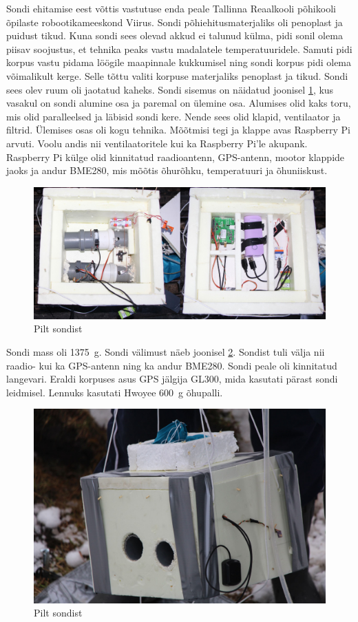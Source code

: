 \documentclass{trkut}%
\begin{document}
Sondi ehitamise eest võttis vastutuse enda peale Tallinna Reaalkooli põhikooli õpilaste robootikameeskond Viirus. Sondi põhiehitusmaterjaliks oli penoplast ja puidust tikud. Kuna sondi sees olevad akkud ei talunud külma, pidi sonil olema piisav soojustus, et tehnika peaks vastu madalatele temperatuuridele. Samuti pidi korpus vastu pidama löögile maapinnale kukkumisel ning sondi korpus pidi olema võimalikult kerge. Selle tõttu valiti korpuse materjaliks penoplast ja tikud. Sondi sees olev ruum oli jaotatud kaheks. Sondi sisemus on näidatud joonisel \ref{sond1}, kus vasakul on sondi alumine osa ja paremal on ülemine osa. Alumises olid kaks toru, mis olid paralleelsed ja läbisid sondi kere. Nende sees olid klapid, ventilaator ja filtrid. Ülemises osas oli kogu tehnika. Mõõtmisi tegi ja klappe avas Raspberry Pi arvuti. Voolu andis nii ventilaatoritele kui ka Raspberry Pi'le akupank. Raspberry Pi külge olid kinnitatud raadioantenn, GPS-antenn, mootor klappide jaoks ja andur BME280, mis mõõtis õhurõhku, temperatuuri ja õhuniiskust.
\begin{figure}[h]
	\includegraphics[width=1\textwidth]{PicGra/sond2korrus.jpg}
	\caption{Pilt sondist}
	\label{sond1}
\end{figure}
Sondi mass oli \SI{1375}{g}. Sondi välimust näeb joonisel \ref{sond2}. Sondist tuli välja nii raadio- kui ka GPS-antenn ning ka andur BME280. Sondi peale oli kinnitatud langevari. Eraldi korpuses asus GPS jälgija GL300, mida kasutati pärast sondi leidmisel. Lennuks kasutati Hwoyee \SI{600}{g} õhupalli.
\begin{figure}[h]
	\includegraphics[width=1\textwidth]{PicGra/sond.jpg}
	\caption{Pilt sondist}
	\label{sond2}
\end{figure}
\end{document}
